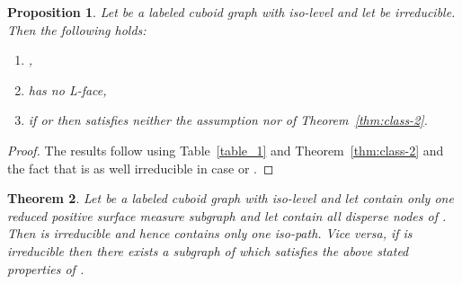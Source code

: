 \documentclass[a4paper,11pt]{article}
\newtheorem{theorem}{Theorem}[section]
\newtheorem{proposition}[theorem]{Proposition}
\begin{document}
\begin{proposition}
Let  be a labeled cuboid graph with iso-level  and let  be irreducible.
Then the following holds:
\begin{enumerate}
\item ,
\item  has no L-face,
\item if  or  then  satisfies neither the assumption  nor  of Theorem~\ref{thm:class-2}.
\end{enumerate}
\label{prop:class-4}
\end{proposition}
\begin{proof}
The results follow using Table~\ref{table_1} and Theorem~\ref{thm:class-2} and the fact that  is as well
irreducible in case  or .
\end{proof}

\begin{theorem}\label{thm:class-3}
Let  be a labeled cuboid graph with iso-level  and let  contain
only one reduced positive surface measure subgraph  and let  contain
all disperse nodes of . Then  is irreducible and hence contains only one iso-path. Vice versa,
if  is irreducible then there exists a subgraph of  which satisfies the above stated properties
of .
\end{theorem}
\end{document}
